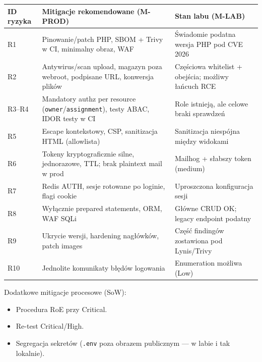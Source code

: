 \documentclass[11pt,a4paper]{article}
\begin{document}
\begin{tabularx}{\textwidth}{@{}l L L@{}}
\toprule
\textbf{ID ryzyka} & \textbf{Mitigacje rekomendowane (M-PROD)} & \textbf{Stan labu (M-LAB)} \\
\midrule
R1 & Pinowanie/patch PHP, SBOM + Trivy w CI, minimalny obraz, WAF & Świadomie podatna wersja PHP pod CVE 2026 \\
R2 & Antywirus/scan upload, magazyn poza webroot, podpisane URL, konwersja plików & Częściowa whitelist + obejścia; możliwy łańcuch RCE \\
R3–R4 & Mandatory authz per resource (\texttt{owner}/\texttt{assignment}), testy ABAC, IDOR testy w CI & Role istnieją, ale celowe braki sprawdzeń \\
R5 & Escape kontekstowy, CSP, sanitizacja HTML (allowlista) & Sanitizacja niespójna między widokami \\
R6 & Tokeny kryptograficznie silne, jednorazowe, TTL; brak plaintext mail w prod & Mailhog + słabszy token (medium) \\
R7 & Redis AUTH, sesje rotowane po loginie, flagi cookie & Uproszczona konfiguracja sesji \\
R8 & Wyłącznie prepared statements, ORM, WAF SQLi & Główne CRUD OK; legacy endpoint podatny \\
R9 & Ukrycie wersji, hardening nagłówków, patch images & Część findingów zostawiona pod Lynis/Trivy \\
R10 & Jednolite komunikaty błędów logowania & Enumeration możliwa (Low) \\
\bottomrule
\end{tabularx}

\vspace{0.5em}
\noindent Dodatkowe mitigacje procesowe (SoW):
\begin{itemize}[leftmargin=*]
  \item Procedura RoE przy Critical.
  \item Re-test Critical/High.
  \item Segregacja sekretów (\texttt{.env} poza obrazem publicznym — w labie i tak lokalnie).
\end{itemize}
\end{document}
